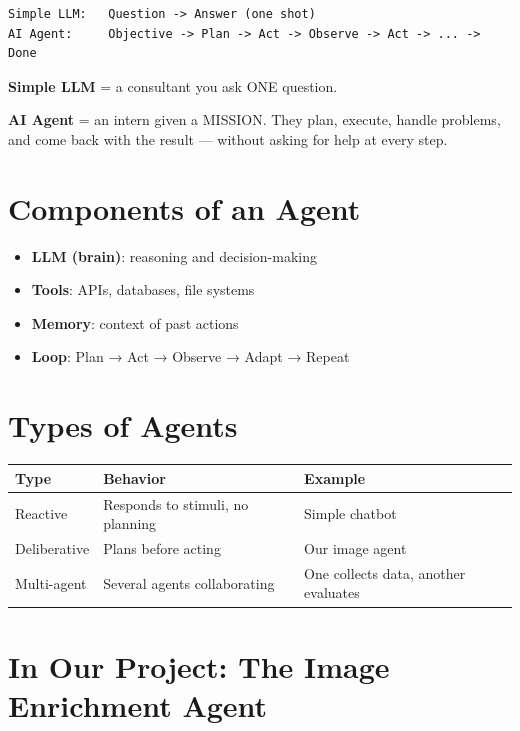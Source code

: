 \documentclass[11pt,a4paper]{report}
\begin{document}
\begin{lstlisting}
Simple LLM:   Question -> Answer (one shot)
AI Agent:     Objective -> Plan -> Act -> Observe -> Act -> ... -> Done
\end{lstlisting}

\begin{analogybox}
\textbf{Simple LLM} = a consultant you ask ONE question.

\textbf{AI Agent} = an intern given a MISSION. They plan, execute, handle problems, and come back with the result --- without asking for help at every step.
\end{analogybox}

\section{Components of an Agent}

\begin{itemize}
    \item \textbf{LLM (brain)}: reasoning and decision-making
    \item \textbf{Tools}: APIs, databases, file systems
    \item \textbf{Memory}: context of past actions
    \item \textbf{Loop}: Plan → Act → Observe → Adapt → Repeat
\end{itemize}

\section{Types of Agents}

\begin{table}[h]
\centering
\begin{tabularx}{\textwidth}{l X X}
\toprule
\textbf{Type} & \textbf{Behavior} & \textbf{Example} \\
\midrule
Reactive & Responds to stimuli, no planning & Simple chatbot \\
Deliberative & Plans before acting & Our image agent \\
Multi-agent & Several agents collaborating & One collects data, another evaluates \\
\bottomrule
\end{tabularx}
\end{table}

\section{In Our Project: The Image Enrichment Agent}
\end{document}
